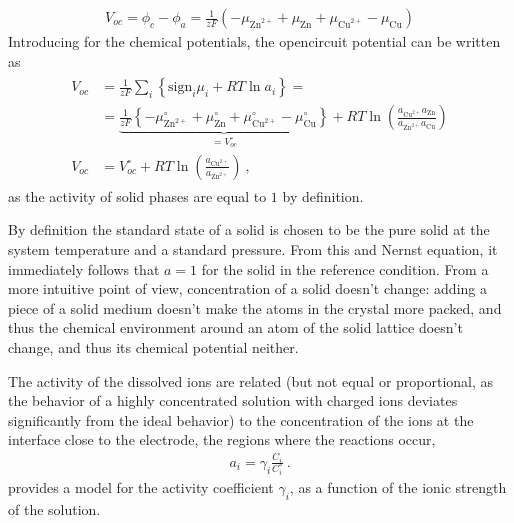 \documentclass[letterpaper,10pt,english]{jupyterBook}
\begin{document}
\begin{equation*}
\begin{split}V_{oc} = \phi_c - \phi_a = \frac{1}{z F} \left( - \mu_{\text{Zn}^{2+}} + \mu_{\text{Zn}} + \mu_{\text{Cu}^{2+}} - \mu_{\text{Cu}} \right)\end{split}
\end{equation*}
\sphinxAtStartPar
Introducing  for the chemical potentials, the open\sphinxhyphen{}circuit potential can be written as
\begin{equation*}
\begin{split}\begin{aligned}
  V_{oc} 
  & = \frac{1}{zF} \sum_i \left\{ \text{sign}_i \mu_i + R T \ln a_i \right\} = \\
  & = \underbrace{ \frac{1}{zF} \left\{ - \mu_{\text{Zn}^{2+}}^\circ + \mu_{\text{Zn}}^\circ + \mu_{\text{Cu}^{2+}}^\circ - \mu_{\text{Cu}}^\circ \right\} }_{ = V_{oc}^\circ} + R T \ln \left( \frac{a_{\text{Cu}^{2+}} a_{\text{Zn}}}{a_{\text{Zn}^{2+}} a_{\text{Cu}}} \right) \\
  V_{oc} & = V_{oc}^\circ + R T \ln \left( \frac{a_{\text{Cu}^{2+}}}{a_{\text{Zn}^{2+}}} \right) \ ,
\end{aligned}\end{split}
\end{equation*}
\sphinxAtStartPar
as the activity of solid phases are equal to \(1\) by definition.%
\begin{footnote}[1]\sphinxAtStartFootnote
By definition the standard state of a solid is chosen to be the pure solid at the system temperature and a standard pressure. From this and Nernst equation, it immediately follows that \(a = 1\) for the solid in the reference condition. From a more intuitive point of view, concentration of a solid doesn’t change: adding a piece of a solid medium doesn’t make the atoms in the crystal more packed, and thus the chemical environment around an atom of the solid lattice doesn’t change, and thus its chemical potential neither.
%
\end{footnote} The activity of the dissolved ions are related (but not equal or proportional, as the behavior of a highly concentrated solution with charged ions deviates significantly from the ideal behavior) to the concentration of the ions at the interface close to the electrode, the regions where the reactions occur,
\begin{equation*}
\begin{split}a_i = \gamma_i \frac{C_i}{C_i^\circ} \ .\end{split}
\end{equation*}
\sphinxAtStartPar
{} provides a model for the activity coefficient \(\gamma_i\), as a function of the ionic strength of the solution.
\end{document}
